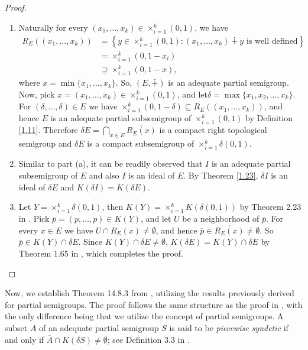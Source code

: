 \documentclass[twoside,11pt]{article}
\begin{document}
\begin{proof}
	\begin{enumerate}
		\item[(a)] Naturally for every $(x_1,\dots,x_k)\in\times_{i=1}^k(0,1)$, we have 
		\begin{align*}
		R_{E}((x_1,\dots,x_k)) 
		&= \left\{ y \in \times_{i=1}^k(0,1) : (x_1,\dots,x_k) \dotplus y \text{ is well defined} \right\} \\
		&= \times_{i=1}^k (0, 1 - x_i) \\
		&\supseteq \times_{i=1}^k (0, 1 - x), 
		\end{align*}
		where $x = \min\{x_1,\dots,x_k\}$. So, $(E,\dotplus)$ is an adequate partial semigroup. Now, pick $x=(x_1,\dots,x_k)\in\times_{i=1}^k(0,1)$, and let\linebreak $\delta = \max\{x_1,x_2,\dots,x_k\}$. For $(\delta,\dots,\delta)\in E$ we have $\times_{i=1}^k(0,1-\delta) \subseteq R_{E}((x_1,\dots,x_k))$, and hence $E$ is an adequate partial subsemigroup of $\times_{i=1}^k (0,1)$ by Definition \ref{1.11}. Therefore $\delta E = \bigcap_{x\in E} \overline{R_{E}(x)}$ is a compact right topological semigroup and $\delta E$ is a compact subsemigroup of $\times_{i=1}^k\delta(0,1)$.
		
		\item[(b)] Similar to part (a), it can be readily observed that $I$ is an adequate partial subsemigroup of $E$ and also $I$ is an ideal of $E$. By Theorem \ref{1.23}, $\delta I$ is an ideal of $\delta E$ and $K(\delta I) = K(\delta E)$.
		
		\item[(c)] Let $Y = \times_{i=1}^k\delta (0,1)$, then $K(Y) = \times_{i=1}^k K(\delta (0,1))$ by Theorem 2.23 in \cite{Hindman}. Pick $\overline{p} = (p,\dots,p) \in K(Y)$, and let $U$ be a neighborhood of $\overline{p}$. For every $x \in E$ we have $U \cap R_{E}(x) \neq \emptyset$, and hence $\overline{p} \in \overline{R_{E}(x)} \neq \emptyset$. So $\overline{p} \in K(Y) \cap \delta E$. Since $K(Y) \cap \delta E \neq \emptyset$, $K(\delta E) = K(Y) \cap \delta E$ by Theorem 1.65 in \cite{Hindman}, which completes the proof. 
	\end{enumerate}
\end{proof}

Now, we establish Theorem 14.8.3 from \cite{Hindman}, utilizing the results previously derived for partial semigroups. The proof follows the same structure as the proof in \cite{Hindman}, with the only difference being that we utilize the concept of partial semigroups. A subset \( A \) of an adequate partial semigroup \( S \) is said to be \textit{piecewise syndetic} if and only if \( \overline{A} \cap K(\delta S) \neq \emptyset \); see Definition 3.3 in \cite{McLeod1}.
\end{document}
